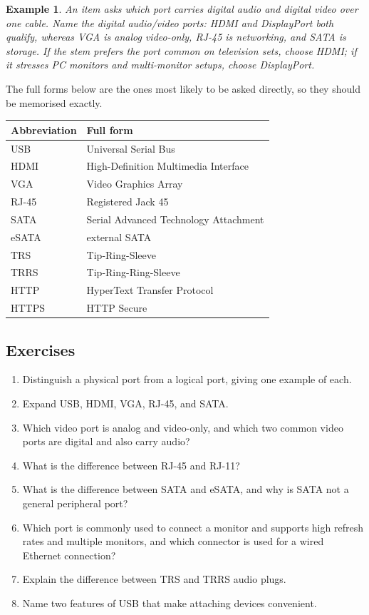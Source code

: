 \documentclass[11pt]{article}
\newtheorem{example}{Example}[section]
\begin{document}
\begin{example}
An item asks which port carries digital audio and digital video over one
cable. Name the digital audio/video ports: HDMI and DisplayPort both qualify,
whereas VGA is analog video-only, RJ-45 is networking, and SATA is storage.
If the stem prefers the port common on television sets, choose HDMI; if it
stresses PC monitors and multi-monitor setups, choose DisplayPort.
\end{example}

The full forms below are the ones most likely to be asked directly, so they
should be memorised exactly.

\begin{center}
\begin{tabular}{p{}p{}}
\toprule
\textbf{Abbreviation} & \textbf{Full form} \\
\midrule
USB & Universal Serial Bus \\
HDMI & High-Definition Multimedia Interface \\
VGA & Video Graphics Array \\
RJ-45 & Registered Jack 45 \\
SATA & Serial Advanced Technology Attachment \\
eSATA & external SATA \\
TRS & Tip-Ring-Sleeve \\
TRRS & Tip-Ring-Ring-Sleeve \\
HTTP & HyperText Transfer Protocol \\
HTTPS & HTTP Secure \\
\bottomrule
\end{tabular}
\end{center}

\subsection*{Exercises}
\begin{enumerate}[label=\arabic*.]
  \item Distinguish a physical port from a logical port, giving one example
    of each.
  \item Expand USB, HDMI, VGA, RJ-45, and SATA.
  \item Which video port is analog and video-only, and which two common video
    ports are digital and also carry audio?
  \item What is the difference between RJ-45 and RJ-11?
  \item What is the difference between SATA and eSATA, and why is SATA not a
    general peripheral port?
  \item Which port is commonly used to connect a monitor and supports high
    refresh rates and multiple monitors, and which connector is used for a
    wired Ethernet connection?
  \item Explain the difference between TRS and TRRS audio plugs.
  \item Name two features of USB that make attaching devices convenient.
\end{enumerate}
\end{document}
